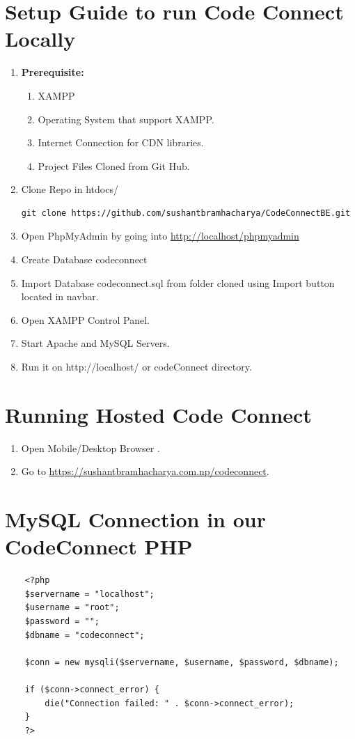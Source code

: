 \section{Setup Guide to run Code Connect Locally}
\begin{enumerate}
    \item \textbf{Prerequisite:}
    \begin{enumerate}
        \item XAMPP
        \item Operating System that support XAMPP.
        \item Internet Connection for CDN libraries.
        \item Project Files Cloned from Git Hub.
    \end{enumerate}
    \item Clone Repo in htdocs/\\
    \begin{verbatim}
git clone https://github.com/sushantbramhacharya/CodeConnectBE.git
    \end{verbatim}
    \item Open PhpMyAdmin by going into \url{http://localhost/phpmyadmin}
    \item Create Database codeconnect
    \item Import Database codeconnect.sql from folder cloned using Import button located in navbar.
    \item Open XAMPP Control Panel.
    \item Start Apache and MySQL Servers.
    \item Run it on http://localhost/ or codeConnect directory.
\end{enumerate}
\section{Running Hosted Code Connect}
\begin{enumerate}
    \item Open Mobile/Desktop Browser .
    \item Go to \url{https://sushantbramhacharya.com.np/codeconnect}.
\end{enumerate}
\section{MySQL Connection in our CodeConnect PHP}
\vspace{1cm}
\begin{lstlisting}
    <?php
    $servername = "localhost";
    $username = "root";
    $password = "";
    $dbname = "codeconnect";

    $conn = new mysqli($servername, $username, $password, $dbname);

    if ($conn->connect_error) {
        die("Connection failed: " . $conn->connect_error);
    }
    ?>
    \end{lstlisting}
    \newpage
